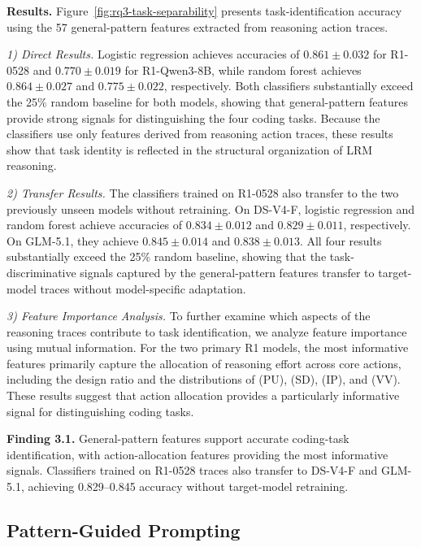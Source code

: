 \documentclass[acmsmall,screen,review,anonymous]{acmart}
\begin{document}
\textbf{Results.}
Figure~\ref{fig:rq3-task-separability} presents task-identification accuracy using the 57 general-pattern features extracted from reasoning action traces.

\textit{1) Direct Results.}
Logistic regression achieves accuracies of $0.861\pm0.032$ for R1-0528 and $0.770\pm0.019$ for R1-Qwen3-8B, while random forest achieves $0.864\pm0.027$ and $0.775\pm0.022$, respectively. Both classifiers substantially exceed the 25\% random baseline for both models, showing that general-pattern features provide strong signals for distinguishing the four coding tasks. Because the classifiers use only features derived from reasoning action traces, these results show that task identity is reflected in the structural organization of LRM reasoning.

\textit{2) Transfer Results.}
The classifiers trained on R1-0528 also transfer to the two previously unseen models without retraining. On DS-V4-F, logistic regression and random forest achieve accuracies of $0.834\pm0.012$ and $0.829\pm0.011$, respectively. On GLM-5.1, they achieve $0.845\pm0.014$ and $0.838\pm0.013$. All four results substantially exceed the 25\% random baseline, showing that the task-discriminative signals captured by the general-pattern features transfer to target-model traces without model-specific adaptation.

\textit{3) Feature Importance Analysis.}
To further examine which aspects of the reasoning traces contribute to task identification, we analyze feature importance using mutual information. For the two primary R1 models, the most informative features primarily capture the allocation of reasoning effort across core actions, including the design ratio and the distributions of (PU), (SD), (IP), and (VV). These results suggest that action allocation provides a particularly informative signal for distinguishing coding tasks.

\begin{tcolorbox}[width=\linewidth, boxrule=0.8pt, left=2pt, right=2pt, top=2pt, bottom=2pt, colback=gray!10, colframe=black]
\textbf{Finding 3.1.}
General-pattern features support accurate coding-task identification, with action-allocation features providing the most informative signals. Classifiers trained on R1-0528 traces also transfer to DS-V4-F and GLM-5.1, achieving 0.829--0.845 accuracy without target-model retraining.
\end{tcolorbox}

\subsection{Pattern-Guided Prompting}
\label{sec:RQ3.2}
\end{document}
